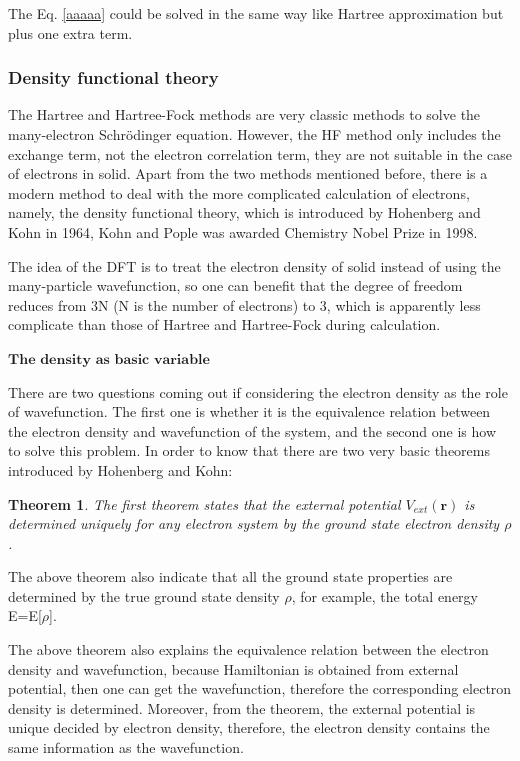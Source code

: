 \documentclass[a4paper, 12pt, titlepage,oneside,drop]{kthesis}
\newtheorem{thm}{Theorem}
\begin{document}
The Eq. \ref{aaaaa} could be solved in the same way like Hartree approximation but plus one extra term.

\subsubsection{Density functional theory}
The Hartree and Hartree-Fock methods are very classic methods to solve the many-electron 
 Schrödinger equation. However, the HF method only includes the exchange term, not the electron correlation term, they are not suitable in the case of electrons in solid.
 Apart from the two methods mentioned before, there is a modern method to deal with
 the more complicated calculation of electrons, namely, the density functional theory, which is introduced by Hohenberg and
 Kohn in 1964, Kohn and Pople was awarded Chemistry Nobel Prize in 1998.

The idea of the DFT is to treat the electron density of solid instead of using the many-particle wavefunction, so one can
 benefit that the degree of freedom reduces from 3N (N is the number of electrons) to 3, which is apparently less complicate than 
those of Hartree and Hartree-Fock during calculation. 

$\textbf{The density as basic variable}$ 

There are two questions coming out if considering the electron density as the role of wavefunction. The first one is whether it
 is the equivalence relation between the electron density and wavefunction of the system, and the second one is how to solve this 
problem. In order to know that there are two very basic theorems introduced by Hohenberg and Kohn:

\begin{thm}
\label{hk1}
\noindent The first theorem states that the external potential $V_\textit{ext}(\textbf{r})$  is determined uniquely for any electron system by the ground state electron density $\rho$.
\end{thm}

The above theorem also indicate that all the ground state properties are determined by the true ground state density $\rho$,
for example, the total energy E=E[$\rho$]. 

The above theorem also explains the equivalence relation between the electron density and wavefunction, because Hamiltonian is obtained from external potential,
then one can get the wavefunction, therefore the corresponding electron density is determined. Moreover, from the theorem, the external potential is unique decided by electron
density, therefore, the electron density contains the same information as the wavefunction.
\end{document}
